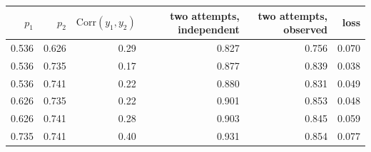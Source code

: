 \begin{tabular}{rrrrrr}\toprule
$p_1$ & $p_2$ & $\mathrm{Corr}(y_1,y_2)$ & two attempts, independent & two attempts, observed & loss\\\midrule
0.536 & 0.626 & 0.29 & 0.827 & 0.756 & 0.070\\
0.536 & 0.735 & 0.17 & 0.877 & 0.839 & 0.038\\
0.536 & 0.741 & 0.22 & 0.880 & 0.831 & 0.049\\
0.626 & 0.735 & 0.22 & 0.901 & 0.853 & 0.048\\
0.626 & 0.741 & 0.28 & 0.903 & 0.845 & 0.059\\
0.735 & 0.741 & 0.40 & 0.931 & 0.854 & 0.077\\
\bottomrule\end{tabular}
